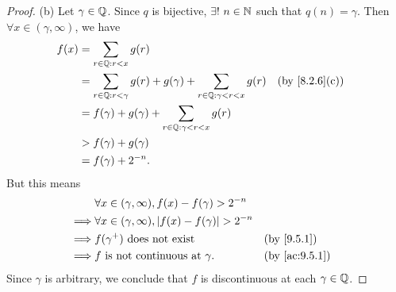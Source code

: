 \begin{proof}{(b)}
  Let \(\gamma \in \mathbb{Q}\).
  Since \(q\) is bijective, \(\exists!\ n \in \mathbb{N}\) such that \(q(n) = \gamma\).
  Then \(\forall x \in (\gamma, \infty)\), we have
  \begin{align*}
    f(x) & = \sum_{r \in \Q : r < x} g(r)                                                                                           \\
         & = \sum_{r \in \Q : r < \gamma} g(r) + g(\gamma) + \sum_{r \in \Q : \gamma < r < x} g(r) &  & \text{(by \cref{8.2.6}(c))} \\
         & = f(\gamma) + g(\gamma) + \sum_{r \in \Q : \gamma < r < x} g(r)                                                          \\
         & > f(\gamma) + g(\gamma)                                                                                                  \\
         & = f(\gamma) + 2^{-n}.
  \end{align*}
  But this means
  \begin{align*}
             & \forall x \in (\gamma, \infty), f(x) - f(\gamma) > 2^{-n}                                        \\
    \implies & \forall x \in (\gamma, \infty), \abs{f(x) - f(\gamma)} > 2^{-n}                                  \\
    \implies & f(\gamma^+) \text{ does not exist}                              &  & \by{9.5.1}                  \\
    \implies & f \text{ is not continuous at } \gamma.                         &  & \text{(by \cref{ac:9.5.1})}
  \end{align*}
  Since \(\gamma\) is arbitrary, we conclude that \(f\) is discontinuous at each \(\gamma \in \mathbb{Q}\).
\end{proof}

